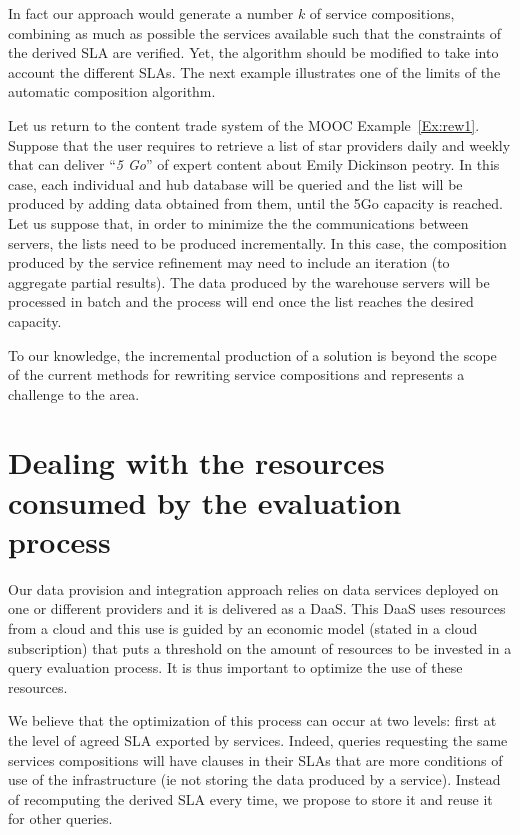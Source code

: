   In fact our approach would generate a number $k$ of service compositions, combining as much as possible the services available such that the constraints of the derived SLA are verified. 
 Yet, the algorithm should be modified to take into account the different SLAs. The next example illustrates one of the limits of the automatic composition algorithm.

\begin{example}\label{Ex:rew2}
Let us return to the content  trade system of the MOOC Example~\ref{Ex:rew1}.
 Suppose that the user requires to retrieve a list of star providers  daily and weekly that can deliver ``\textit{5 Go}'' of expert content about Emily Dickinson peotry.
In this case, each individual and hub database will be queried and the list will be produced by adding data obtained from them, until the 5Go  capacity is reached.
Let us suppose that, in order to minimize the the communications between servers, the lists need to be produced incrementally.
In this case, the composition produced by the service refinement may need to include an iteration (to aggregate partial results). 
The data produced by the warehouse servers will be processed in batch and the process will end once the list reaches the desired capacity.

To our knowledge, the incremental production of a solution is beyond  the scope of the current methods for rewriting service compositions and represents a challenge to the area.
~\hfill\openbox
\end{example}

 
\section{Dealing with the resources consumed by the evaluation process}
\label{sec:queryProcessOpt}
 Our data provision and integration approach relies on data services deployed on one or different providers and it is delivered as a DaaS. This DaaS  uses resources from a cloud and this use  is  guided by an economic model (stated in a cloud subscription) that puts a threshold on the amount of resources to be invested in a query evaluation process. It is thus important to optimize the use of these resources.
 
 We believe that the optimization of this process can occur at two levels: first at the level of agreed SLA exported by services.  Indeed, queries requesting the same services compositions will have clauses in their SLAs that are more conditions of use of the infrastructure (ie not storing the data produced by a service). Instead of recomputing the derived SLA every time, we propose to store it and reuse it for other queries. 
 
